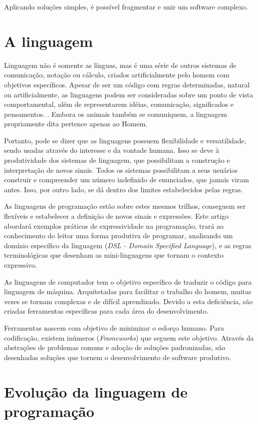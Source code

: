 \documentclass[espaco=simples,appendix=Name]{abnt}
\begin{document}
Aplicando soluções simples, é possível fragmentar e unir um software complexo.
\chapter{A linguagem}


Linguagem não é somente as línguas, mas é uma série de outros sistemas de comunicação, notação ou cálculo, criados artificialmente pelo homem com objetivos específicos. Apesar de ser um código com regras determinadas, natural ou artificialmente, as linguagens podem ser consideradas sobre um ponto de vista comportamental, além de representarem idéias, comunicação, significados e pensamentos. \cite{linguagemLinguistica}. Embora os animais também se comuniquem, a linguagem propriamente dita pertence apenas ao Homem\cite{wikiLinguagem}.


Portanto, pode se dizer que as linguagens possuem flexibilidade e versatilidade, sendo usadas através do interesse e da vontade humana. Isso se deve à produtividade dos sistemas de linguagem, que possibilitam a construção e interpretação de novos sinais. Todos os sistemas possibilitam a seus usuários construir e compreender um número indefinido de enunciados, que jamais viram antes. Isso, por outro lado, se dá dentro dos limites estabelecidos pelas regras.

As linguagens de programação estão sobre estes mesmos trilhos, conseguem ser flexíveis e estabelecer a definição de novos sinais e expressões. Este artigo abordará exemplos práticos de expressividade na programação, trará ao conhecimento do leitor uma forma produtiva de programar, analisando um domínio específico da linguagem (\textit{DSL - Domain Specified Language}), e as regras terminológicas que desenham as mini-linguagens que tornam o contexto expressivo.

As linguagens de computador tem o objetivo específico de traduzir o código para linguagem de máquina. Arquitetadas para facilitar o trabalho do homem, muitas vezes se tornam complexas e de difícil aprendizado. Devido a esta deficiência, são criadas ferramentas específicas para cada área do desenvolvimento. 

Ferramentas nascem com objetivo de minimizar o esforço humano. Para codificação, existem inúmeros (\textit{Frameworks}) que seguem este objetivo. Através da abstrações de problemas comuns e adoção de soluções padronizadas, são desenhadas soluções que tornem o desenvolvimento de software produtivo.


\chapter{Evolução da linguagem de programação}
\end{document}
